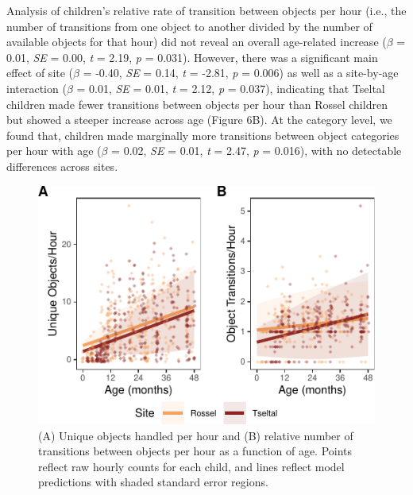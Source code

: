 \documentclass[10pt, letterpaper]{article}
\newenvironment{CodeChunk}{}{}
\begin{document}
Analysis of children's relative rate of transition between objects per
hour (i.e., the number of transitions from one object to another divided
by the number of available objects for that hour) did not reveal an
overall age-related increase (\(\beta\) = 0.01, \emph{SE} = 0.00,
\emph{t} = 2.19, \emph{p} = 0.031). However, there was a significant
main effect of site (\(\beta\) = -0.40, \emph{SE} = 0.14, \emph{t} =
-2.81, \emph{p} = 0.006) as well as a site-by-age interaction (\(\beta\)
= 0.01, \emph{SE} = 0.01, \emph{t} = 2.12, \emph{p} = 0.037), indicating
that Tseltal children made fewer transitions between objects per hour
than Rossel children but showed a steeper increase across age (Figure
6B). At the category level, we found that, children made marginally more
transitions between object categories per hour with age (\(\beta\) =
0.02, \emph{SE} = 0.01, \emph{t} = 2.47, \emph{p} = 0.016), with no
detectable differences across sites.

\begin{CodeChunk}
\begin{figure}[!ht]

{\centering \includegraphics{figs/age-effects-fig-1} 

}

\caption[(A) Unique objects handled per hour and (B) relative number of transitions between objects per hour as a function of age]{(A) Unique objects handled per hour and (B) relative number of transitions between objects per hour as a function of age. Points reflect raw hourly counts for each child, and lines reflect model predictions with shaded standard error regions.}\label{fig:age-effects-fig}
\end{figure}
\end{CodeChunk}
\end{document}
